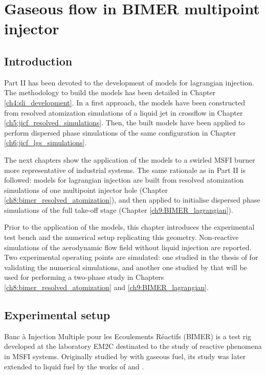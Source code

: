 \chapter{Gaseous flow in BIMER multipoint injector}
	\label{ch9:bimer_test_bench_and_aero}

\section{Introduction}

Part II has been devoted to the development of models for lagrangian injection. The methodology to build the models has been detailed in Chapter \ref{ch4:sli_development}. In a first approach, the models have been constructed from resolved atomization simulations of a liquid jet in crossflow in Chapter \ref{ch5:jicf_resolved_simulations}. Then, the built models have been applied to perform dispersed phase simulations of the same configuration in Chapter \ref{ch6:jicf_lgs_simulations}.

The next chapters show the application of the models to a swirled MSFI burner more representative of industrial systems. The same rationale as in Part II is followed: models for lagrangian injection are built from resolved atomization simulations of one multipoint injector hole (Chapter \ref{ch8:bimer_resolved_atomization}), and then applied to initialise dispersed phase simulations of the full take-off stage (Chapter \ref{ch9:BIMER_lagrangian}). 

Prior to the application of the models, this chapter introduces the experimental test bench and the numerical setup replicating this geometry. Non-reactive simulations of the aerodynamic flow field without liquid injection are reported. Two experimental operating points are simulated: one studied in the thesis of  for validating the numerical simulations, and another one studied by  that will be used for performing a two-phase study in Chapters \ref{ch8:bimer_resolved_atomization} and \ref{ch9:BIMER_lagrangian}.


\section{Experimental setup}

Banc à Injection Multiple pour les Ecoulements Réactifs (BIMER) is a test rig developed at the laboratory EM2C destinated to the study of reactive phenomena in MSFI systems. Originally studied by  with gaseous fuel, its study was later extended to liquid fuel by the works of  and .

